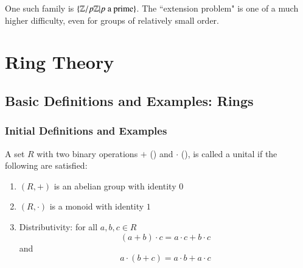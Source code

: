 \documentclass[12pt, a4paper, twoside, openright, titlepage]{book}
\begin{document}
One such family is $\{\mathbb Z/p\mathbb Z\vert p\text{ a prime}\}$. The ``extension problem" is one of a much higher difficulty, even for groups of relatively small order.





\part{Ring Theory}


\chapter{\textsection\textsection Basic Definitions and Examples: Rings}

\section{\textsection Initial Definitions and Examples}



\begin{defn}{}{}
    A set $R$ with two binary operations $+$ () and $\cdot$ (), is called a unital  if the following are satisfied:
    \begin{enumerate}
        \item $(R,+)$ is an abelian group with identity $0$
        \item $(R,\cdot)$ is a monoid with identity $1$
        \item Distributivity: for all $a,b,c \in R$ $$(a + b)\cdot c = a\cdot c + b\cdot c$$
        and $$a\cdot (b+c) = a\cdot b + a\cdot c$$
    \end{enumerate}
\end{defn}
\end{document}

